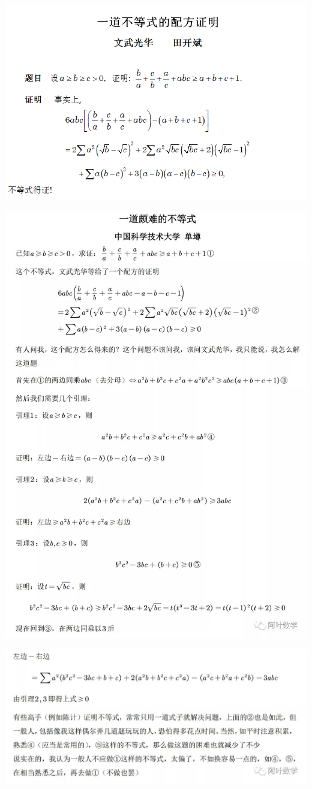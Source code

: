 \documentclass[UTF8]{ctexart}
\begin{document}
\subsection{}
\begin{center}
	\includegraphics[width=0.8\linewidth]{a17}
\end{center}
\begin{center}
	\includegraphics[width=0.9\linewidth]{a18}
\end{center}
\begin{center}
	\includegraphics[width=0.9\linewidth]{a19}
\end{center}
\end{document}
